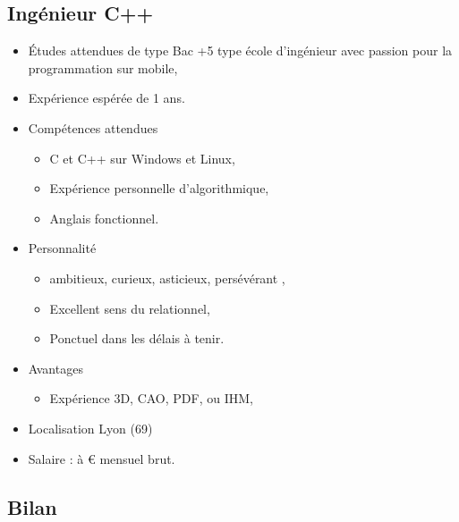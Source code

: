 \documentclass[12pt, a4paper]{report} %
\begin{document}
\subsection{Ingénieur C++}
\begin{itemize}
\item Études attendues de type Bac +5 type école d'ingénieur avec passion pour la programmation sur mobile,
\item Expérience espérée de 1 ans.
\item Compétences attendues  
  \begin{itemize}
    \item  C et C++ sur Windows et Linux,
    \item  Expérience personnelle d'algorithmique,
    \item  Anglais fonctionnel.
  \end{itemize}
\item Personnalité 
  \begin{itemize}
    \item ambitieux, curieux, asticieux, persévérant \etc{},
    \item Excellent sens du relationnel,
    \item Ponctuel dans les délais à tenir.
  \end{itemize}
\item Avantages 
  \begin{itemize}
    \item Expérience 3D, CAO, PDF, ou IHM,
  \end{itemize}
\item Localisation  Lyon (69)
\item Salaire :  à  \euro{} mensuel brut.
\end{itemize}

\subsection*{Bilan}
\end{document}
